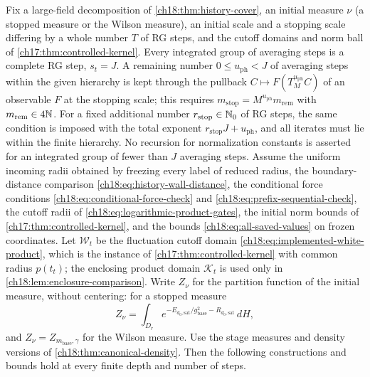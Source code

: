 \begin{theorem}\label{ch18:thm:slice-induction}
Fix a large-field decomposition of \cref{ch18:thm:history-cover}, an initial measure $\nu$ (a stopped measure or the Wilson measure), an initial scale and a stopping scale differing by a whole number $T$ of RG steps, and the cutoff domains and norm ball of \cref{ch17:thm:controlled-kernel}. Every integrated group of averaging steps is a complete RG step, $s_t=J$. A remaining number $0\le u_{\mathrm{ph}}<J$ of averaging steps within the given hierarchy is kept through the pullback $C\mapsto F(T_M^{u_{\mathrm{ph}}}C)$ of an observable $F$ at the stopping scale; this requires $m_{\mathrm{stop}}=M^{u_{\mathrm{ph}}}m_{\mathrm{rem}}$ with $m_{\mathrm{rem}}\in4\mathbb N$. For a fixed additional number $r_{\mathrm{stop}}\in\mathbb N_0$ of RG steps, the same condition is imposed with the total exponent $r_{\mathrm{stop}}J+u_{\mathrm{ph}}$, and all iterates must lie within the finite hierarchy. No recursion for normalization constants is asserted for an integrated group of fewer than $J$ averaging steps. Assume the uniform incoming radii obtained by freezing every label of reduced radius, the boundary-distance comparison \eqref{ch18:eq:history-wall-distance}, the conditional force conditions \eqref{ch18:eq:conditional-force-check} and \eqref{ch18:eq:prefix-sequential-check}, the cutoff radii of \eqref{ch18:eq:logarithmic-product-gates}, the initial norm bounds of \cref{ch17:thm:controlled-kernel}, and the bounds \eqref{ch18:eq:all-saved-values} on frozen coordinates. Let $\mathcal W_t$ be the fluctuation cutoff domain \eqref{ch18:eq:implemented-white-product}, which is the instance of \cref{ch17:thm:controlled-kernel} with common radius $p(t_t)$; the enclosing product domain $\mathcal K_t$ is used only in \cref{ch18:lem:enclosure-comparison}. Write $Z_\nu$ for the partition function of the initial measure, without centering: for a stopped measure
\[
 Z_\nu=\int_{D_r}e^{-E_{d_0,\mathrm{sat}}/g_{\mathrm{base}}^2
                         -R_{d_0,\mathrm{sat}}}\,dH,
\]
and $Z_\nu=Z_{m_{\mathrm{base}},\gamma}$ for the Wilson measure. Use the stage measures and density versions of \cref{ch18:thm:canonical-density}. Then the following constructions and bounds hold at every finite depth and number of steps.
\begin{enumerate}

\end{enumerate}
\end{theorem}
